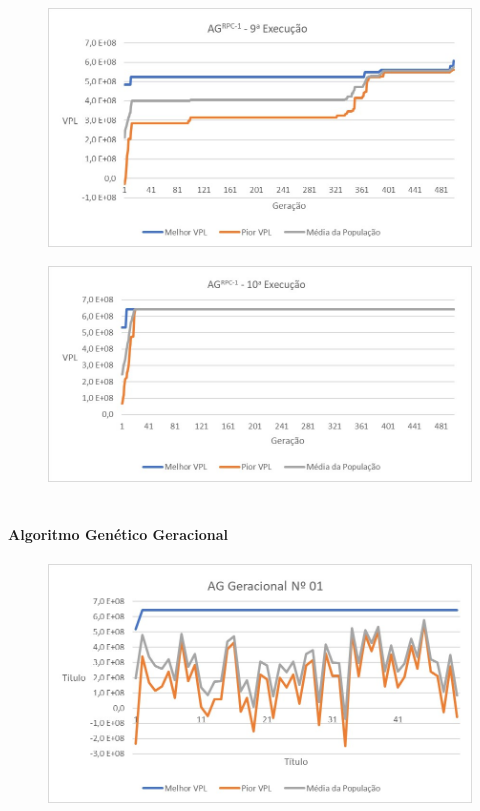 \documentclass[12pt,a4paper]{report}
\begin{document}
\begin{figure}[H]
\centering

\includegraphics[scale=1]{ApA/AGRPC/9}
\end{figure}

\begin{figure}[H]
\centering

\includegraphics[scale=1]{ApA/AGRPC/10}
\end{figure}

\chapter{}
\subsubsection{Algoritmo Genético Geracional}

\begin{figure}[H]
\centering

\includegraphics[scale=1]{ApB/AGG/1}

\end{figure}
\end{document}
